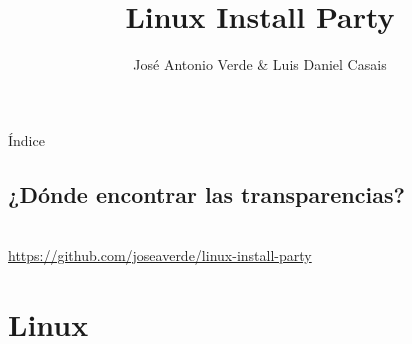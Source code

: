 \documentclass[aspectratio=43]{beamer}
\title{Linux Install Party}
\author{%
    José Antonio Verde \& Luis Daniel Casais%
}
\institute{Grupo de Usuarios de Linux}
\date{\fecha}
\begin{document}
    {
        \frame{\titlepage}
    }
    \addtocounter{framenumber}{-1}
    \begin{frame}{Índice}
        \begin{multicols}{2}
            \tableofcontents

        \end{multicols}
    \end{frame}


    \subsection*{¿Dónde encontrar las transparencias?}
    \begin{frame}[plain]{\subsecname}
        \centering{}
        \hphantom{}\\
        \bigskip
        \url{https://github.com/joseaverde/linux-install-party}
    \end{frame}

    \section{Linux}

\end{document}
